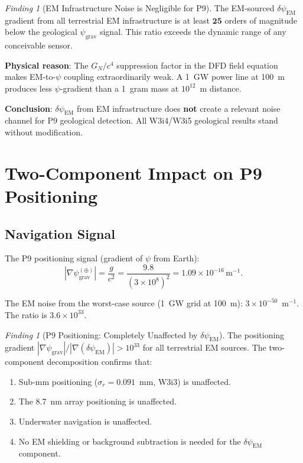\documentclass[11pt]{article}
\theoremstyle{definition}
\theoremstyle{remark}
\newtheorem{finding}[theorem]{Finding}
\newcommand{\ee}[1]{\times10^{#1}}
\newcommand{\psigrav}{\psi_{\mathrm{grav}}}
\newcommand{\dpsiem}{\delta\psi_{\mathrm{EM}}}
\newcommand{\GN}{G_N}
\begin{document}
\begin{finding}[EM Infrastructure Noise is Negligible for P9]
\label{finding:P9-EM-noise}
The EM-sourced $\dpsiem$ gradient from all terrestrial EM infrastructure
is at least $\mathbf{25}$ orders of magnitude below the geological
$\psigrav$ signal. This ratio exceeds the dynamic range of any
conceivable sensor.

\textbf{Physical reason}: The $\GN/c^4$ suppression factor in the
DFD field equation makes EM-to-$\psi$ coupling extraordinarily weak.
A 1~GW power line at 100~m produces less $\psi$-gradient than a
1~gram mass at $10^{12}$~m distance.

\textbf{Conclusion}: $\dpsiem$ from EM infrastructure does \textbf{not}
create a relevant noise channel for P9 geological detection. All W3i4/W3i5
geological results stand without modification.
\end{finding}

\section{Two-Component Impact on P9 Positioning}
\label{sec:P9-positioning}

\subsection{Navigation Signal}

The P9 positioning signal (gradient of $\psi$ from Earth):
\begin{equation}
|\nabla\psigrav^{(\oplus)}| = \frac{g}{c^2}
= \frac{9.8}{(3\ee{8})^2} = 1.09\ee{-16}\,\mathrm{m}^{-1}.
\end{equation}

The EM noise from the worst-case source (1~GW grid at 100~m):
$3\ee{-50}$~m$^{-1}$. The ratio is $3.6\ee{33}$.

\begin{finding}[P9 Positioning: Completely Unaffected by $\dpsiem$]
\label{finding:P9-positioning}
The positioning gradient $|\nabla\psigrav|/|\nabla(\dpsiem)|
> 10^{33}$ for all terrestrial EM sources. The two-component decomposition
confirms that:
\begin{enumerate}[nosep]
\item Sub-mm positioning ($\sigma_r = 0.091$~mm, W3i3) is unaffected.
\item The 8.7~nm array positioning is unaffected.
\item Underwater navigation is unaffected.
\item No EM shielding or background subtraction is needed for the
  $\dpsiem$ component.
\end{enumerate}
\end{finding}
\end{document}
